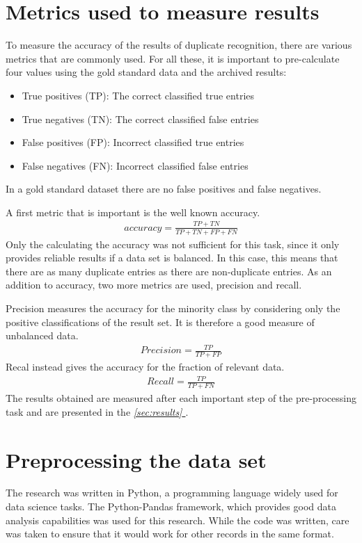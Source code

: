 \documentclass[conference]{IEEEtran}
\newcommand*{\fullref}[1]{\textit{\hyperref[{#1}]{\autoref*{#1} \nameref*{#1}}}}
\begin{document}
\section{Metrics used to measure results} \label{sec:metrics}
To measure the accuracy of the results of duplicate recognition, there are various metrics that are commonly used. For all these, it is important to pre-calculate four values using the gold standard data and the archived results:  
\begin{itemize}
	\item True positives (TP): The correct classified true entries
	\item True negatives (TN): The correct classified false entries
	\item False positives (FP): Incorrect classified true entries
	\item False negatives (FN): Incorrect classified false entries
\end{itemize}
In a gold standard dataset there are no false positives and false negatives\cite{bib:reach_for_gold}.

A first metric that is important is the well known accuracy. 
\begin{align}
 accuracy =  \frac{TP + TN}{TP + TN + FP + FN}
\end{align}
Only the calculating the accuracy was not sufficient for this task, since it only provides reliable results if a data set is balanced. In this case, this means that there are as many duplicate entries as there are non-duplicate entries. As an addition to accuracy, two more metrics are used, precision and recall.

Precision measures the accuracy for the minority class by considering only the positive classifications of the result set. It is therefore a good measure of unbalanced data.
\begin{align}
	Precision = \frac{TP}{TP + FP}
\end{align}
Recal instead gives the accuracy for the fraction of relevant data.
\begin{align}
	Recall = \frac{TP}{TP + FN}
\end{align}
The results obtained are measured after each important step of the pre-processing task and are presented in the \fullref{sec:results}.
\section{Preprocessing the data set} \label{sec_methods}
The research was written in Python, a programming language widely used for data science tasks. The Python-Pandas framework, which provides good data analysis capabilities was used for this research\cite{bib:pandas_doc}. While the code was written, care was taken to ensure that it would work for other records in the same format. 
\end{document}
